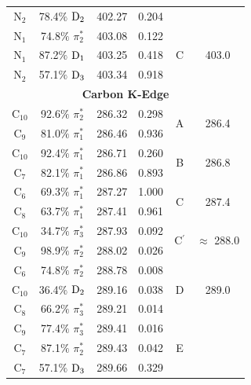 \documentclass[12pt]{article}
\begin{document}
\begin{table}[!ht]
\begin{tabular*}{8.5cm}{@{\extracolsep{\fill} }cccccc}
    N$_2$
 &   78.4$\%$ $\rm D_2$  & 402.27 & 0.204
 \vspace{0.05in}\\ 
    N$_1$
 &   74.8$\%$ $\pi_2^*$  & 403.08 & 0.122 & \multirow{3}{*}{C} & \multirow{3}{*}{403.0} \\
    N$_1$
 &   87.2$\%$ $\rm D_1$  & 403.25 & 0.418 \\
    N$_2$
 &   57.1$\%$ $\rm D_3$  & 403.34 & 0.918
 \vspace{0.05in}\\
 \multicolumn{6}{c}{\textbf{Carbon K-Edge}} \vspace{0.05in}\\
     C$_{10}$
 &   92.6$\%$ $\pi_2^*$  & 286.32 & 0.298 & \multirow{2}{*}{A} & \multirow{2}{*}{286.4}\\
    C$_9$
 &   81.0$\%$ $\pi_1^*$  & 286.46 & 0.936 
 \vspace{0.05in}\\
    C$_{10}$
 &   92.4$\%$ $\pi_1^*$  & 286.71 & 0.260 &  \multirow{2}{*}{B} &  \multirow{2}{*}{286.8} \\
    C$_7$
 &   82.1$\%$ $\pi_1^*$  & 286.86 & 0.893 
 \vspace{0.05in}\\
    C$_6$
 &   69.3$\%$ $\pi_1^*$  & 287.27 & 1.000 &  \multirow{2}{*}{C} &  \multirow{2}{*}{287.4}\\
    C$_8$
 &   63.7$\%$ $\pi_1^*$  & 287.41 & 0.961 
 \vspace{0.05in}\\
    C$_{10}$
 &   34.7$\%$ $\pi_3^*$  & 287.93 & 0.092 & \multirow{2}{*}{C$^{\prime}$} &  \multirow{2}{*}{$\approx$ 288.0}\\
    C$_9$
 &   98.9$\%$ $\pi_2^*$
 & 288.02 & 0.026 
 \vspace{0.05in}\\
    C$_6$
 &   74.8$\%$ $\pi_2^*$  & 288.78 & 0.008 & \multirow{3}{*}{D} & \multirow{3}{*}{289.0} \\
    C$_{10}$
 &   36.4$\%$ $\rm D_2$  & 289.16 & 0.038 \\
    C$_8$
 &   66.2$\%$ $\pi_3^*$  & 289.21 & 0.014 
 \vspace{0.05in}\\
    C$_9$
 &   77.4$\%$ $\pi_3^*$  & 289.41 & 0.016 & \multirow{3}{*}{E} \\
    C$_7$
 &   87.1$\%$ $\pi_2^*$  & 289.43 & 0.042 \\
    C$_7$
 &   57.1$\%$ $\rm D_3$  & 289.66 & 0.329 
 \vspace{0.05in}\\ 

\end{tabular*}
\end{table}
\end{document}
